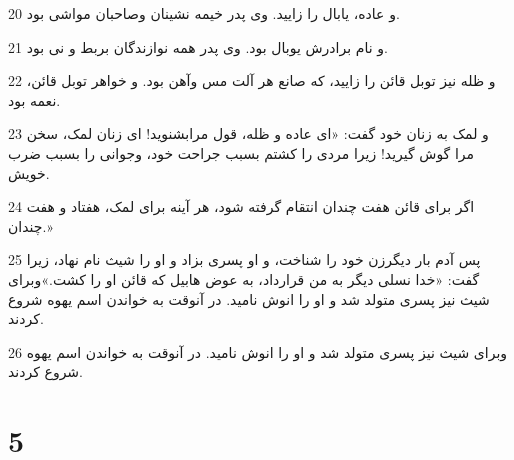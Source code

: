 \par 20 و عاده، یابال را زایید. وی پدر خیمه نشینان وصاحبان مواشی بود.
\par 21 و نام برادرش یوبال بود. وی پدر همه نوازندگان بربط و نی بود.
\par 22 و ظله نیز توبل قائن را زایید، که صانع هر آلت مس وآهن بود. و خواهر توبل قائن، نعمه بود.
\par 23 و لمک به زنان خود گفت: «ای عاده و ظله، قول مرابشنوید! ای زنان لمک، سخن مرا گوش گیرید! زیرا مردی را کشتم بسبب جراحت خود، وجوانی را بسبب ضرب خویش.
\par 24 اگر برای قائن هفت چندان انتقام گرفته شود، هر آینه برای لمک، هفتاد و هفت چندان.»
\par 25 پس آدم بار دیگرزن خود را شناخت، و او پسری بزاد و او را شیث نام نهاد، زیرا گفت: «خدا نسلی دیگر به من قرارداد، به عوض هابیل که قائن او را کشت.»وبرای شیث نیز پسری متولد شد و او را انوش نامید. در آنوقت به خواندن اسم یهوه شروع کردند.
\par 26 وبرای شیث نیز پسری متولد شد و او را انوش نامید. در آنوقت به خواندن اسم یهوه شروع کردند.
 
\chapter{5}

